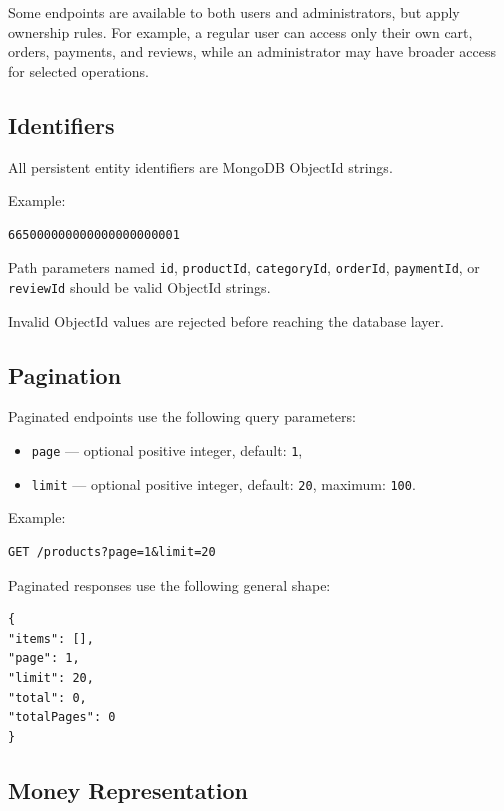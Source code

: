 Some endpoints are available to both users and administrators, but apply ownership rules. For example, a regular user can access only their own cart, orders, payments, and reviews, while an administrator may have broader access for selected operations.

\subsection{Identifiers}

All persistent entity identifiers are MongoDB ObjectId strings.

Example:

\begin{verbatim}
665000000000000000000001
\end{verbatim}

Path parameters named \texttt{id}, \texttt{productId}, \texttt{categoryId}, \texttt{orderId}, \texttt{paymentId}, or \texttt{reviewId} should be valid ObjectId strings.

Invalid ObjectId values are rejected before reaching the database layer.

\subsection{Pagination}

Paginated endpoints use the following query parameters:

\begin{itemize}
    \item \texttt{page} --- optional positive integer, default: \texttt{1},
    \item \texttt{limit} --- optional positive integer, default: \texttt{20}, maximum: \texttt{100}.
\end{itemize}

Example:

\begin{verbatim}
GET /products?page=1&limit=20
\end{verbatim}

Paginated responses use the following general shape:

\begin{verbatim}
{
"items": [],
"page": 1,
"limit": 20,
"total": 0,
"totalPages": 0
}
\end{verbatim}

\subsection{Money Representation}

